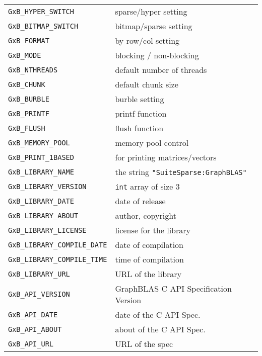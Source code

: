 \documentclass[12pt]{article}
\begin{document}
\vspace{0.2in}
{\footnotesize
\begin{tabular}{ll}
        \hline
        \verb'GxB_HYPER_SWITCH'         & sparse/hyper setting \\
        \verb'GxB_BITMAP_SWITCH'        & bitmap/sparse setting \\
        \verb'GxB_FORMAT'               & by row/col setting \\
        \verb'GxB_MODE'                 & blocking / non-blocking \\
        \verb'GxB_NTHREADS'             & default number of threads \\
        \verb'GxB_CHUNK'                & default chunk size \\
        \verb'GxB_BURBLE'       & burble setting \\
        \verb'GxB_PRINTF'       & printf function \\
        \verb'GxB_FLUSH'        & flush function \\
        \verb'GxB_MEMORY_POOL'  & memory pool control \\
        \verb'GxB_PRINT_1BASED' & for printing matrices/vectors \\
        \hline
        \verb'GxB_LIBRARY_NAME'         & the string
                                        \verb'"SuiteSparse:GraphBLAS"' \\
        \verb'GxB_LIBRARY_VERSION'      & \verb'int' array of size 3 \\
        \verb'GxB_LIBRARY_DATE'         & date of release \\
        \verb'GxB_LIBRARY_ABOUT'        & author, copyright \\
        \verb'GxB_LIBRARY_LICENSE'      & license for the library \\
        \verb'GxB_LIBRARY_COMPILE_DATE' & date of compilation \\
        \verb'GxB_LIBRARY_COMPILE_TIME' & time of compilation \\
        \verb'GxB_LIBRARY_URL'          & URL of the library \\
        \hline
        \verb'GxB_API_VERSION'  & GraphBLAS C API Specification Version \\
        \verb'GxB_API_DATE'     & date of the C API Spec.  \\
        \verb'GxB_API_ABOUT'    & about of the C API Spec. \\
        \verb'GxB_API_URL'      & URL of the spec \\
        \hline
\end{tabular}
}
\vspace{0.2in}
\end{document}
